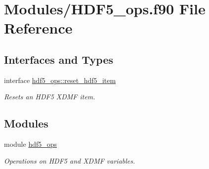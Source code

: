 \hypertarget{HDF5__ops_8f90}{}\section{Modules/\+H\+D\+F5\+\_\+ops.f90 File Reference}
\label{HDF5__ops_8f90}
\subsection*{Interfaces and Types}
\begin{DoxyCompactItemize}
\item 
interface \hyperlink{interfacehdf5__ops_1_1reset__hdf5__item}{hdf5\+\_\+ops\+::reset\+\_\+hdf5\+\_\+item}
\begin{DoxyCompactList}\small\item\em Resets an H\+D\+F5 X\+D\+MF item. \end{DoxyCompactList}\end{DoxyCompactItemize}
\subsection*{Modules}
\begin{DoxyCompactItemize}
\item 
module \hyperlink{namespacehdf5__ops}{hdf5\+\_\+ops}
\begin{DoxyCompactList}\small\item\em Operations on H\+D\+F5 and X\+D\+MF variables. \end{DoxyCompactList}\end{DoxyCompactItemize}
